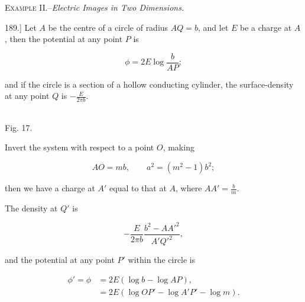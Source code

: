 \documentclass[11pt,a4paper]{article}
\begin{document}
\begin{center}
\textsc{Example II.}--\textit{Electric Images in Two Dimensions.}
\end{center}

189.] Let $A$ be the centre of a circle of radius $AQ=b$, and let $E$ be a charge at $A$, then the potential at any point $P$ is

\begin{equation}\tag{8}
\phi = 2E \log \frac{b}{AP};
\end{equation}

and if the circle is a section of a hollow conducting cylinder, the surface-density at any point $Q$ is $-\frac{E}{2\pi b}$.

\begin{center}
\\
{\small Fig. 17.}
\end{center}

Invert the system with respect to a point $O$, making

\[
AO=mb,\qquad a^2=(m^2-1)b^2;
\]

then we have a charge at $A'$ equal to that at $A$, where $AA'=\frac{b}{m}$.

The density at $Q'$ is

\[
-\frac{E}{2\pi b}\frac{b^2-AA'^2}{A'Q'^2},
\]

and the potential at any point $P'$ within the circle is

\begin{equation}\tag{9}
\begin{split}
\phi'=\phi
&= 2E(\log b-\log AP),\\
&= 2E(\log OP'-\log A'P'-\log m).
\end{split}
\end{equation}
\end{document}
